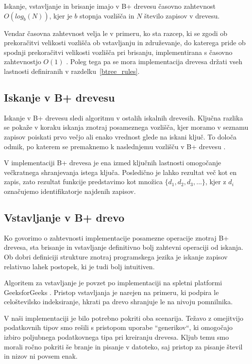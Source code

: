 \documentclass[a4paper,12pt,openright]{book}
\begin{document}
        Iskanje, vstavljanje in brisanje imajo v B+ drevesu časovno zahtevnost \newline $O(log_b(N))$, kjer je $b$ stopnja vozlišča in $N$ število zapisov v drevesu.

        Vendar časovna zahtevnost velja le v primeru, ko sta razcep, ki se zgodi ob prekoračitvi velikosti vozlišča ob vstavljanju in združevanje, do katerega pride ob spodnji prekoračitvi velikosti vozlišča pri brisanju, implementirana s časovno zahtevnostjo $O(1)$ \cite{goodrich2011data}. Poleg tega pa se mora implementacija drevesa držati vseh lastnosti definiranih v razdelku~\ref{btree_rules}.

        \subsection{Iskanje v B+ drevesu}

        Iskanje v B+ drevesu sledi algoritmu v ostalih iskalnih drevesih. Ključna razlika se pokaže v koraku iskanja znotraj posameznega vozlišča, kjer moramo v seznamu zapisov poiskati prvo večjo ali enako vrednost glede na iskani ključ. To določa odmik, po katerem se premaknemo k naslednjemu vozlišču v B+ drevesu \cite{goodrich2011data}.

        V implementaciji B+ drevesa je ena izmed ključnih lastnosti omogočanje večkratnega shranjevanja istega ključa. Posledično je lahko rezultat več kot en zapis, zato rezultat funkcije predstavimo kot množica $\{d_1, d_2, d_3, \ldots\}$, kjer z $d_i$ označujemo identifikatorje najdenih zapisov.

        \subsection{Vstavljanje v B+ drevo}

        Ko govorimo o zahtevnosti implementacije posamezne operacije znotraj B+ drevesa, sta brisanje in vstavljanje definitivno bolj zahtevni operaciji od iskanja. Ob dobri definiciji strukture znotraj programskega jezika je iskanje zapisov relativno lahek postopek, ki je tudi bolj intuitiven.

        Algoritem za vstavljanje je povzet po implementaciji na spletni platformi GeeksforGeeks \cite{G4G_BINSERT}. Pristop vstavljanja je narejen na primeru, ki podpira le celoštevilsko indeksiranje, hkrati pa drevo shranjuje le na nivoju pomnilnika.
        
        V naši implementaciji je bilo potrebno pokriti oba scenarija. Težavo z omejitvijo podatkovnih tipov smo rešili s pristopom uporabe ``generikov``, ki omogočajo izbiro poljubnega podatkovnega tipa pri kreiranju drevesa. Kljub temu smo morali ročno pokriti še branje in pisanje v datoteko, saj pristop za pisanje števil in nizov ni povsem enak.
\end{document}
